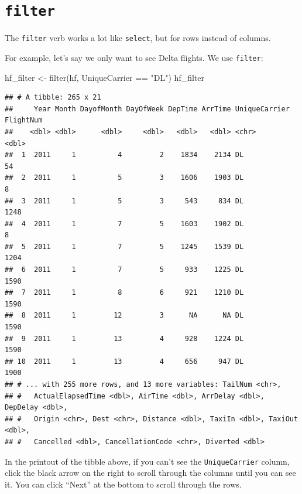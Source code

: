 \documentclass[
]{book}
\newenvironment{Shaded}{\begin{snugshade}}{\end{snugshade}}
\newcommand{\FunctionTok}[1]{\textcolor[rgb]{0.00,0.00,0.00}{#1}}
\newcommand{\NormalTok}[1]{#1}
\newcommand{\OtherTok}[1]{\textcolor[rgb]{0.56,0.35,0.01}{#1}}
\newcommand{\SpecialCharTok}[1]{\textcolor[rgb]{0.00,0.00,0.00}{#1}}
\newcommand{\StringTok}[1]{\textcolor[rgb]{0.31,0.60,0.02}{#1}}
\begin{document}
\hypertarget{manipulating-filter}{%
\section{\texorpdfstring{\texttt{filter}}{filter}}\label{manipulating-filter}}

The \texttt{filter} verb works a lot like \texttt{select}, but for rows instead of columns.

For example, let's say we only want to see Delta flights. We use \texttt{filter}:

\begin{Shaded}
\begin{Highlighting}[]
\NormalTok{hf\_filter }\OtherTok{\textless{}{-}} \FunctionTok{filter}\NormalTok{(hf, UniqueCarrier }\SpecialCharTok{==} \StringTok{"DL"}\NormalTok{)}
\NormalTok{hf\_filter}
\end{Highlighting}
\end{Shaded}

\begin{verbatim}
## # A tibble: 265 x 21
##     Year Month DayofMonth DayOfWeek DepTime ArrTime UniqueCarrier FlightNum
##    <dbl> <dbl>      <dbl>     <dbl>   <dbl>   <dbl> <chr>             <dbl>
##  1  2011     1          4         2    1834    2134 DL                   54
##  2  2011     1          5         3    1606    1903 DL                    8
##  3  2011     1          5         3     543     834 DL                 1248
##  4  2011     1          7         5    1603    1902 DL                    8
##  5  2011     1          7         5    1245    1539 DL                 1204
##  6  2011     1          7         5     933    1225 DL                 1590
##  7  2011     1          8         6     921    1210 DL                 1590
##  8  2011     1         12         3      NA      NA DL                 1590
##  9  2011     1         13         4     928    1224 DL                 1590
## 10  2011     1         13         4     656     947 DL                 1900
## # ... with 255 more rows, and 13 more variables: TailNum <chr>,
## #   ActualElapsedTime <dbl>, AirTime <dbl>, ArrDelay <dbl>, DepDelay <dbl>,
## #   Origin <chr>, Dest <chr>, Distance <dbl>, TaxiIn <dbl>, TaxiOut <dbl>,
## #   Cancelled <dbl>, CancellationCode <chr>, Diverted <dbl>
\end{verbatim}

In the printout of the tibble above, if you can't see the \texttt{UniqueCarrier} column, click the black arrow on the right to scroll through the columns until you can see it. You can click ``Next'' at the bottom to scroll through the rows.
\end{document}
